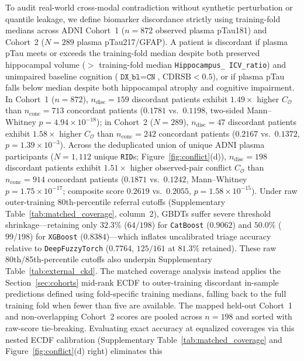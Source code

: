 \documentclass[10pt,twocolumn]{article}
\begin{document}
To audit real-world cross-modal contradiction without synthetic perturbation or quantile
leakage, we define biomarker discordance strictly using training-fold medians across ADNI
Cohort~1 ($n=872$ observed plasma pTau181) and Cohort~2 ($N=289$ plasma pTau217/GFAP). A
patient is discordant if plasma pTau meets or exceeds the training-fold median despite both
preserved hippocampal volume ($>$ training-fold median \texttt{Hippocampus\_\allowbreak
ICV\_\allowbreak ratio}) and unimpaired baseline cognition ($\texttt{DX\_bl}=\texttt{CN}$,
$\text{CDRSB}<0.5$), or if plasma pTau falls below median despite both hippocampal atrophy and
cognitive impairment. In Cohort~1 ($n=872$), $n_{\text{disc}}=159$ discordant patients exhibit
$1.49\times$ higher $C_{\mathcal{O}}$ than $n_{\text{conc}}=713$ concordant patients ($0.1781$
vs.\ $0.1198$, two-sided Mann--Whitney $p = 4.94 \times 10^{-18}$); in Cohort~2 ($N=289$),
$n_{\text{disc}}=47$ discordant patients exhibit $1.58\times$ higher $C_{\mathcal{O}}$ than
$n_{\text{conc}}=242$ concordant patients ($0.2167$ vs.\ $0.1372$, $p = 1.39 \times 10^{-3}$).
Across the deduplicated union of unique ADNI plasma participants ($N=1,112$ unique
\texttt{RID}s; Figure~\ref{fig:conflict}(d)), $n_{\text{disc}}=198$ discordant patients exhibit
$1.51\times$ higher observed-pair conflict $C_{\mathcal{O}}$ than $n_{\text{conc}}=914$
concordant patients ($0.1871$ vs.\ $0.1242$, Mann--Whitney $p = 1.75 \times 10^{-17}$;
composite score $0.2619$ vs.\ $0.2055$, $p = 1.58 \times 10^{-15}$). Under raw outer-training
80th-percentile referral cutoffs (Supplementary Table~\ref{tab:matched_coverage}, column~2),
GBDTs suffer
severe threshold shrinkage---retaining only $32.3\%$ ($64/198$) for \texttt{CatBoost}
($0.9062$)
and $50.0\%$ ($99/198$) for \texttt{XGBoost} ($0.8384$)---which inflates uncalibrated triage
accuracy relative to \texttt{DeepFuzzyTorch} ($0.7764$, $125/161$ at $81.3\%$ retained).
These raw 80th/85th-percentile cutoffs also underpin Supplementary
Table~\ref{tab:external_ckd}. The matched
coverage analysis instead applies the Section~\ref{sec:cohorts} mid-rank ECDF to
outer-training discordant in-sample predictions defined using fold-specific training medians,
falling back to the full
training fold when fewer than five are available. The mapped held-out Cohort~1 and
non-overlapping Cohort~2 scores are pooled across $n=198$ and sorted with raw-score
tie-breaking. Evaluating exact accuracy at equalized coverages via this nested ECDF calibration
(Supplementary Table~\ref{tab:matched_coverage} and Figure~\ref{fig:conflict}(d) right)
eliminates this
\end{document}
